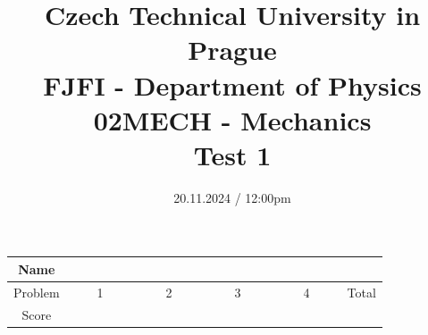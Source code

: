 \documentclass[a4paper,12pt]{article}
\title{{\large Czech Technical University in Prague} \\
    {\Large FJFI - Department of Physics} \\ 
                  02MECH - Mechanics \\ 
          {\Large \textbf{Test 1}}\vspace{-1cm}}
\date{20.11.2024 / 12:00pm}
\author{}
\begin{document}
\maketitle
\vspace{-1.5em}

\begin{center}
    \renewcommand{\arraystretch}{2}
    \begin{tabular}{ |c|c|c|c|c|c| } 
        \hline
        Name& \multicolumn{5}{c|}{\phantom{~~~~~~~~~~~~~~~~~~~~~~~~~~~~~~~~~~~~~~~~~~~~~~~~~~~~~~~~~~~~~~~~~~~~~~~~~~~~~~~~~}}\\
        \hline
        Problem & ~~~~1~~~~ & ~~~~2~~~~ & ~~~~3~~~~ & ~~~~4~~~~ & Total \\ 
        \hline
        Score & &  & & & \\
        \hline
    \end{tabular}
\end{center}

\vspace*{1cm}







\end{document}
